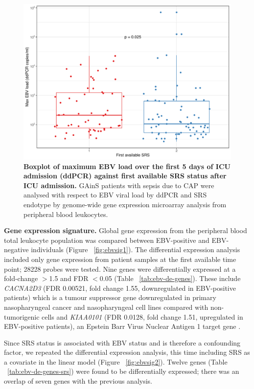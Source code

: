 \FloatBarrier
\begin{figure}[htbp]
\centering
\includegraphics[width=\textwidth]{./Results3/Images/ebvload.pdf}
\caption[EBV load and SRS status]{\textbf{Boxplot of maximum EBV load over the first 5 days of ICU admission (ddPCR) against first available SRS status after ICU admission.} GAinS patients with sepsis due to CAP were analysed with respect to EBV viral load by ddPCR and SRS endotype by genome-wide gene expression microarray analysis from peripheral blood leukocytes.}
\label{fig:ebvload}


\end{figure}
\FloatBarrier

\textbf{Gene expression signature.} 
Global gene expression from the peripheral blood total leukocyte population was compared between EBV-positive and EBV-negative individuals (Figure ~\ref{fig:ebvsig1}). The differential expression analysis included only gene expression from patient samples at the first available time point; 28228 probes were tested. Nine genes were differentially expressed at a fold-change $>$1.5 and FDR $<$0.05 (Table ~\ref{tab:ebv-de-genes}). These include \textit{CACNA2D3} (FDR 0.00521, fold change 1.55, downregulated in EBV-positive patients) which is a tumour suppressor gene downregulated in primary nasopharyngeal cancer and nasopharyngeal cell lines compared with non-tumorigenic cells \parencite{Wong2013} and \textit{KIAA0101} (FDR 0.0128, fold change 1.51, upregulated in EBV-positive patients), an Epstein Barr Virus Nuclear Antigen 1 target gene \parencite{Satoh2013}.

Since SRS status is associated with EBV status and is therefore a confounding factor, we repeated the differential expression analysis, this time including SRS as a covariate in the linear model (Figure ~\ref{fig:ebvsig2}). Twelve genes (Table ~\ref{tab:ebv-de-genes-srs}) were found to be differentially expressed; there was an overlap of seven genes with the previous analysis.

